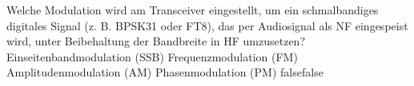     {Welche Modulation wird am Transceiver eingestellt, um ein schmalbandiges digitales Signal (z. B. BPSK31 oder FT8), das per Audiosignal als NF eingespeist wird, unter Beibehaltung der Bandbreite in HF umzusetzen?}
    {Einseitenbandmodulation (SSB)}
    {Frequenzmodulation (FM)}
    {Amplitudenmodulation (AM)}
    {Phasenmodulation (PM)}
    {false}{false}